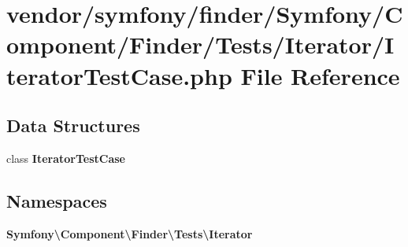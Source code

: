 \section{vendor/symfony/finder/\+Symfony/\+Component/\+Finder/\+Tests/\+Iterator/\+Iterator\+Test\+Case.php File Reference}
\label{_iterator_test_case_8php}
\subsection*{Data Structures}
\begin{DoxyCompactItemize}
\item 
class {\bf Iterator\+Test\+Case}
\end{DoxyCompactItemize}
\subsection*{Namespaces}
\begin{DoxyCompactItemize}
\item 
 {\bf Symfony\textbackslash{}\+Component\textbackslash{}\+Finder\textbackslash{}\+Tests\textbackslash{}\+Iterator}
\end{DoxyCompactItemize}
